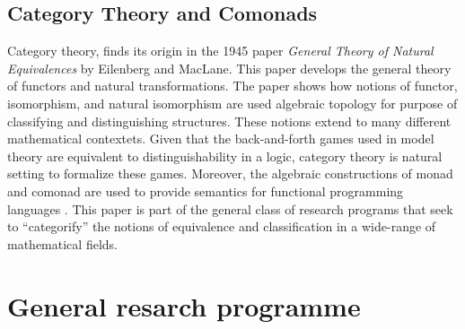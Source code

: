 \subsection{Category Theory and Comonads}
Category theory, finds its origin in the 1945 paper \textit{General Theory of Natural Equivalences} by Eilenberg and MacLane. This paper develops the general theory of functors and natural transformations. The paper shows how notions of functor, isomorphism, and natural isomorphism are used algebraic topology for purpose of classifying and distinguishing structures. These notions extend to many different mathematical contextets. Given that the back-and-forth games used in model theory are equivalent to distinguishability in a logic, category theory is natural setting to formalize these games. Moreover, the algebraic constructions of monad and comonad are used to provide semantics for functional programming languages \cite{Moggi1991} \cite{BrookesGeva1992}. This paper is part of the general class of research programs that seek to ``categorify'' the notions of equivalence and classification in a wide-range of mathematical fields.   
\section{General resarch programme}

